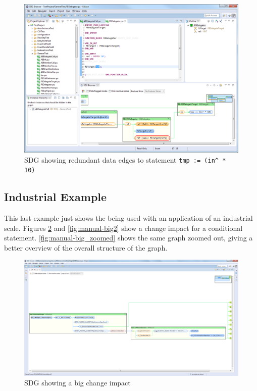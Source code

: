 \begin{figure}[hpb]
  \centering
    \includegraphics[width=\textwidth]{bilder/manual-ci3}
  \caption[SDG showing redundant data edges]
    {SDG showing redundant data edges to statement \lstinline|tmp := (in^ * 10)|}
  \label{fig:manual-ci3}
\end{figure}


\subsection*{Industrial Example}

This last example just shows the \SB being used with an application of an industrial scale. Figures 
\ref{fig:manual-big1} and \ref{fig:manual-big2} show a change impact for a conditional statement. 
\autoref{fig:manual-big_zoomed} shows the same graph zoomed out, giving a better overview of the overall structure of 
the graph.

\begin{figure}[p]
  \centering
    \includegraphics[width=\textwidth]{bilder/manual-big1}
  \caption{SDG showing a big change impact}
  \label{fig:manual-big1}
\end{figure}

